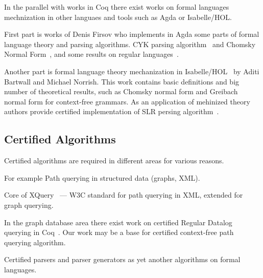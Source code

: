 In the parallel with works in Coq there exist works on formal languages mechnization in other languaes and tools such as Agda or Isabelle/HOL.

First part is works of Denis Firsov who implements in Agda some parts of formal language theory and parsing algorithms.
CYK parsing algorithm~\cite{firsov2014certified,firsov2016cfl} and Chomsky Normal Form~\cite{firsov2015certified}, and some results on regular languages~\cite{10.1007/978-3-319-03545-1_7}.

Another part is formal language theory mechanization in Isabelle/HOL~\cite{1885-16399,barthwal2010formalisation,10.1007/978-3-642-13824-9_11} by Aditi Bartwall and Michael Norrish.
This work contains basic definitions and big number of theoretical results, such as Chomsky normal form and Greibach normal form for context-free grammars. 
As an application of mehinized theory authors provide certified implementation of SLR persing algorithm~\cite{10.1007/978-3-642-00590-9_12}.

\subsection{Certified Algorithms}

Certified algorithms are required in different areas for various reasons.

For example Path querying in structured data (graphs, XML).

Core of XQuery~\cite{10.1007/978-3-642-25379-9_21} --- W3C standard for path querying in XML, extended for graph querying.

In the graph database area there exist work on certified Regular Datalog querying in Coq~\cite{certifiedPrologGraphQuerying}. 
Our work may be a base for certified context-free path querying algorithm.

Certified parsers and parser generators as yet another algorithms on formal languages.
